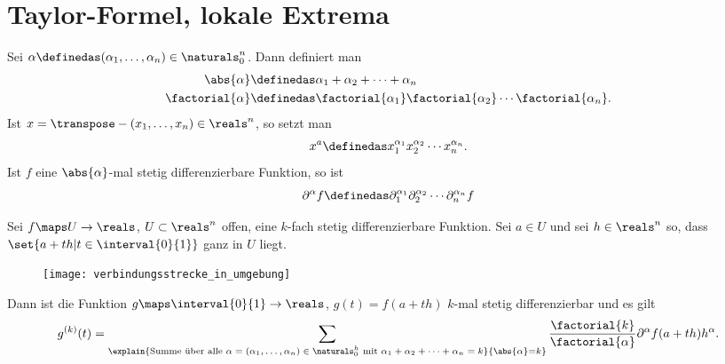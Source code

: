 \section{Taylor-Formel, lokale Extrema}
\begin{notation}
  Sei \( \alpha\definedas(\alpha_1,\dotsc,\alpha_n)\in \naturals_{0}^n \). Dann definiert man
  \begin{align*}
    \abs{\alpha}&\definedas\alpha_1+\alpha_2+\dotsb+\alpha_n\\
    \factorial{\alpha}&\definedas \factorial{\alpha_1}\factorial{\alpha_2}\dotsb\factorial{\alpha_n}.
  \end{align*}
  Ist \( x=\transpose-{(x_1,\dotsc,x_n)}\in \reals^n \), so setzt man 
  \begin{equation*}
    x^{a}\definedas x_1^{\alpha_1}x_2^{\alpha_2}\dotsb x_n^{\alpha_n}.
  \end{equation*}
  Ist \( f \) eine \( \abs{\alpha} \)-mal stetig differenzierbare Funktion, so ist 
  \begin{equation*}
    \partial^{\alpha}f\definedas \partial_1^{\alpha_1}\partial_2^{\alpha_2}\dotsb\partial_n^{\alpha_n}f
  \end{equation*}
\end{notation}
\begin{lemma}\label{funktion_entlang_gerade_ableitung}
  Sei \( f\maps U\to \reals \), \( U\subset \reals^n \) offen, eine \( k \)-fach stetig differenzierbare Funktion. Sei \( a\in U \) und sei \( h\in \reals^n \) so, dass \( \set{a+th|t\in \interval{0}{1}} \) ganz in \( U \) liegt.
  \begin{figure}[H]
    \centering
    \texttt{[image: verbindungsstrecke\_in\_umgebung]}
    \label{fig:verbindungsstrecke_in_umgebung}
  \end{figure}
  Dann ist die Funktion \( g\maps \interval{0}{1}\to \reals \), \( g(t)=f(a+th) \) \( k \)-mal stetig differenzierbar und es gilt 
  \begin{equation*}
    g^{(k)}(t)=\sum_{\explain{\text{Summe über alle \( \alpha=(\alpha_1,\dotsc,\alpha_n)\in \naturals_0^h \) mit \( \alpha_1+\alpha_2+\dotsb+\alpha_n=k \)}}{\abs{\alpha}=k}}\frac{\factorial{k}}{\factorial{\alpha}}\partial^{\alpha}f(a+th)h^{\alpha}.
  \end{equation*}
\end{lemma}
